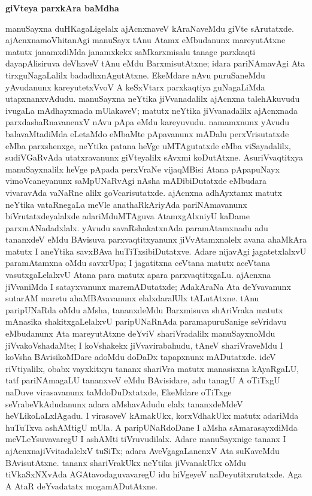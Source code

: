 \newpage

\begin{center}
\textbf{\Large{giVteya parxkAra baMdha}}
\end{center}

manuSayxna duHKagaLigelalx ajAcnxnaveV kAraNaveMdu giVte sArutatxde. ajAcnxna\-moVhitanAgi manuSayx tAnu Atamx eMbudanunx mareyutAtxne matutx janamxdiMda janamxkekx saMkarxmisalu tanage parxkaqti dayapAlisiruva deVhaveV tAnu eMdu BarxmisutAtxne; idara pariNAmavAgi Ata tirxguNagaLalilx badadhxnAgutAtxne. EkeMdare nAvu puruSaneMdu yAvudanunx kareyutetxVvoV A keSxVtarx parxkaqtiya guNagaLiMda utapxnanxvAdudu. manuSayxna neYtika jiVvanadalilx ajAcnxna talehAkuvudu ivugaLa mAdhayxmada mUlakaveV; matutx neYtika jiVvanadalilx ajAcnxnada parxdashaRnavanenxV nAvu pApa eMdu kareyuvudu. namamxnunx yAvudu balavaMtadiMda eLetaMdo eMbaMte pApavanunx mADalu perxVrisutatxde eMba parxshenxge, neYtika patana heVge uMTAgutatxde eMba viSayadalilx, sudiVGaRvAda utatxravanunx giVteyalilx sAvxmi koDutAtxne. AsuriVvaqtitxya manuSayxnalilx heVge pApada perxVraNe vijaqMBisi Atana pApapuNayx vimoVcaneyanunx saMpUNaRvAgi nAsha mADibiDutatxde eMbudara vivaravAda vaNaRne alilx goVcarisutatxde. ajAcnxna adhAyxtamx matutx neYtika vataRnegaLa meVle anathaRkAriyAda pariNAmavanunx biVrutatxdeyalalxde adariMduMTAguva AtamxgAlxniyU kaDame parxmANadadxlalx. yAvudu savaRshakatxnAda paramAtamxnadu adu tananxdeV eMdu BAvisuva parxvaqtitxyanunx jiVvAtamxnalelx avana ahaMkAra matutx I aneYtika savxBAva huTiTxsibiDutatxve. Adare nijavAgi jagatetxlalxvU paramAtamxna oMdu savxrUpa; I jagatitxna ceVtana matutx aceVtana vasutxgaLelalxvU Atana para matutx apara parxvaqtitxgaLu. ajAcnxna jiVvaniMda I satayxvanunx maremADutatxde; AdakAraNa Ata deYvavanunx sutarAM maretu ahaMBAvavanunx elalxdaralUlx tALutAtxne. tAnu paripUNaRda oMdu aMsha, tananxdeMdu Barxmisuva shAriVraka matutx mAnasika shakitxgaLelalxvU paripUNaRnAda paramapuruSanige seVridavu eMbudanunx Ata mareyutAtxne deYviV shariVradalilx manuSayxnoMdu jiVvakoVshadaMte; I koVshakekx jiVvavirabahudu, tAneV shariVraveMdu I koVsha BAvisikoMDare adoMdu doDaDx tapapxnunx mADutatxde. ideV riVtiyalilx, obabx vayxkitxyu tananx shariVra matutx manasisxna kAyaRgaLU, tatf pariNAmagaLU tananxveV eMdu BAvisidare, adu tanagU A oTiTxgU naDuve virasavanunx taMdoDuDxtatxde, EkeMdare oTiTxge seVrabeVkAdudanunx adara aMshavAdudu elalx tananxdeMdeV heVLikoLaLxlAgadu. I virasaveV kAmakUkx, korxVdhakUkx matutx adariMda huTuTxva ashAMtigU mUla. A paripUNaRdoDane I aMsha sAmarasayxdiMda meVLeYsuvavaregU I ashAMti tiVruvudilalx. Adare manuSayxnige tananx I ajAcnxnajiVvitadalelxV tuSiTx; adara AveVgagaLanenxV Ata suKaveMdu BAvisutAtxne. tananx shariVrakUkx neYtika jiVvanakUkx oMdu tiVkaSxNXvAda AGAtavodaguvavaregU idu hiVgeyeV naDeyutitxrutatxde. Aga A AtaR deYvadatatx mogamADutAtxne.

